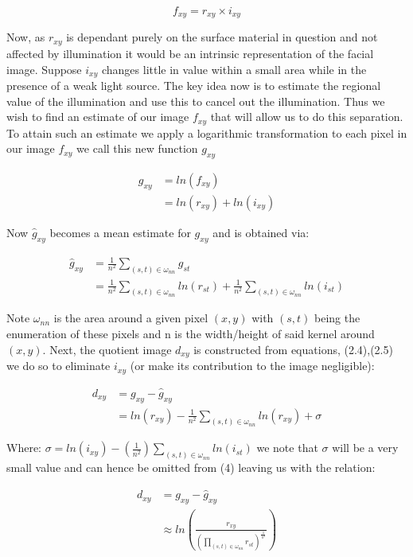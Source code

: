 		\begin{equation}
			f_{xy} = r_{xy}	\times i_{xy}	
		\end{equation}
		
	Now, as $r_{xy}$ is dependant purely on the surface material in question and not affected by illumination it would be an 
	intrinsic representation of the facial image.  Suppose $i_{xy}$ changes little in value	within a small area while in the 
	presence of a weak light source.  The key idea now is to estimate the regional value of the illumination and use this to 
	cancel out the illumination. Thus we wish to find an estimate of our image $f_{xy}$ that will allow us to do this separation.  
	To attain such an estimate we apply a logarithmic transformation to each pixel in our image $f_{xy}$ we call this new function 
	$g_{xy}$
		
		\begin{align}
			g_{xy} &= ln(f_{xy}) \nonumber \\
			&= ln(r_{xy}) + ln(i_{xy})
		\end{align}
		
	Now $\hat{g}_{xy}$ becomes a mean estimate for $g_{xy}$ and is obtained via: 
		
		\begin{align}
			\hat{g}_{xy} &= \frac{1}{n^2} \sum_{(s,t)\in\omega_{nn}} g_{st} \nonumber \\
			&=  \frac{1}{n^2} \sum_{(s,t)\in\omega_{nn}} ln(r_{st}) + \frac{1}{n^2} \sum_{(s,t)\in\omega_{nn}} ln(i_{st})
		\end{align}

	Note $\omega_{nn}$ is the area around a given pixel $(x,y)$ with $(s,t)$ being the enumeration of these pixels and n is the 
	width/height of said kernel around $(x,y)$.  Next, the quotient image $d_{xy}$ is constructed from equations, (2.4),(2.5) we 
	do so to eliminate $i_{xy}$ (or make its contribution to the image negligible):
		
		\begin{align}
			d_{xy} &= g_{xy} - \hat{g}_{xy} 	\nonumber \\
			&= ln(r_{xy}) - \frac{1}{n^2} \sum_{(s,t)\in\omega_{nn}} ln(r_{xy}) + \sigma
		\end{align} 
		
	Where: $\sigma = ln(i_{xy}) -(\frac{1}{n^2})\sum_{(s,t)\in\omega_{nn}} ln(i_{st})$ we note that $\sigma$ will be a very small 
	value and can hence be omitted from (4) leaving us with the relation:
		
		\begin{align}
		d_{xy} &= g_{xy} - \hat{g}_{xy} \nonumber \\
		&\approx ln(\frac{r_{xy}}{(\prod_{(s,t)\in\omega_{nn}} r_{st})^{\frac{1}{\pi^2}} })
		\end{align}
		
